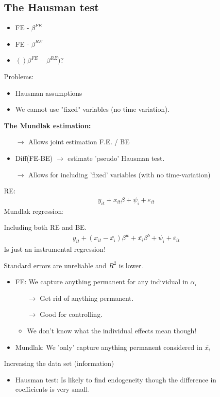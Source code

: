 \begin{multicols}{2}
\subsection{The Hausman test}
\begin{itemize}
  \item FE - $\beta^{FE}$
  \item FE - $\beta^{RE}$
  \item $()\beta^{FE}-\beta^{RE})$?
\end{itemize}
Problems:
\begin{itemize}
  \item Hausman assumptions
  \item We cannot use "fixed" variables (no time variation).
\end{itemize}
\textbf{The Mundlak estimation:}
\begin{itemize}
  \item[$\rightarrow$] Allows joint estimation F.E. / BE
  \item Diff(FE-BE) $\rightarrow$ estimate 'pseudo' Hausman test.
  \item[$\rightarrow$] Allows for including 'fixed' variables (with no time-variation)
\end{itemize}
RE:
\begin{align*}
  y_{it}+x_{it}\beta+\psi_i+\varepsilon_{it}
\end{align*}
Mundlak regression:\par
Including both RE and BE.
\begin{align*}
  y_{it}+(x_{it}-\bar{x_i})\beta^w+\bar{x_i}\beta^b +\psi_i+\varepsilon_{it}
\end{align*}
Is just an instrumental regression!\par
Standard errors are unreliable and $R^2$ is lower.
\begin{itemize}
  \item FE: We capture anything permanent for any individual in $\alpha_i$
  \begin{itemize}
    \item[$\rightarrow$] Get rid of anything permanent.
    \item[$\rightarrow$] Good for controlling.
    \item We don't know what the individual effects mean though!
  \end{itemize}
  \item Mundlak: We 'only' capture anything permanent considered in $\bar{x_i}$
\end{itemize}
Increasing the data set (information)
\begin{itemize}
  \item Hausman test: Is likely to find endogeneity though the difference in coefficients is very small.
\end{itemize}


\end{multicols}
